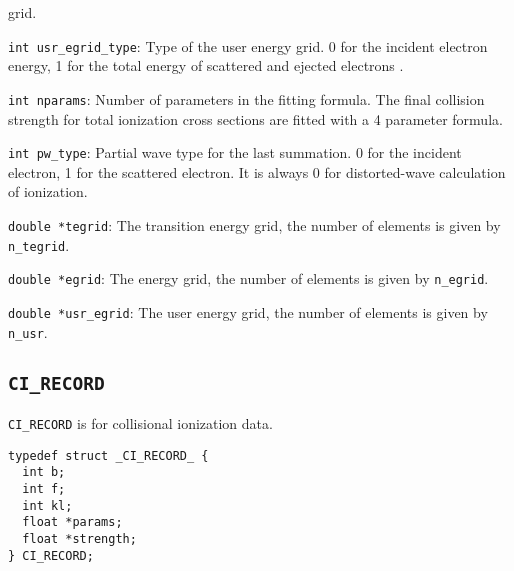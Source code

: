 \begin{dbdesc}
grid.
\item[\texttt{int usr\_egrid\_type}:] Type of the user energy grid. 0 for the
incident electron energy, 1 for the total energy of scattered and ejected
electrons .
\item[\texttt{int nparams}:] Number of parameters in the fitting formula. The
final collision strength for total ionization cross sections are fitted with a
4 parameter formula.
\item[\texttt{int pw\_type}:] Partial wave type for the last summation. 0 for
the incident electron, 1 for the scattered electron. It is always 0 for
distorted-wave calculation of ionization.
\item[\texttt{double *tegrid}:] The transition energy grid, the number of
elements is given by \texttt{n\_tegrid}.
\item[\texttt{double *egrid}:] The energy grid, the number of elements is
given by \texttt{n\_egrid}.
\item[\texttt{double *usr\_egrid}:] The user energy grid, the number of
elements is given by \texttt{n\_usr}.
\end{dbdesc}

\subsection{\texttt{CI\_RECORD}}
\texttt{CI\_RECORD} is for collisional ionization data.

\begin{verbatim}
typedef struct _CI_RECORD_ {
  int b;
  int f;
  int kl;
  float *params;
  float *strength;
} CI_RECORD;
\end{verbatim}

